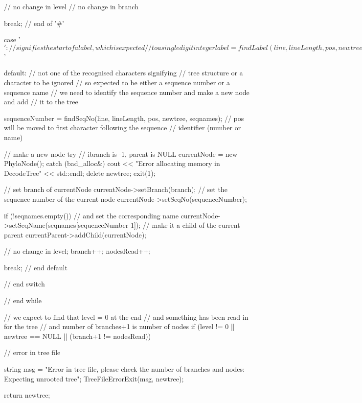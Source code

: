 \begin{DoxyCode}
{{{        // no change in level
        // no change in branch

        break;      // end of '#'

      case '$' :    // signifies the start of a label, which is expected 
                    // to a single digit integer
        label = findLabel(line, lineLength, pos, newtree);
        // findLabel() updates pos to be the character after 
        // the end of the label

                    // make the currentNode label the integer at this pos
        currentNode->setLabel(label);

        // no change in level
        // no change in branch

        break;      // end of '$'

      default:      // not one of the recognised characters signifying 
                    // tree structure or a character to be ignored
        // so expected to be either a sequence number or a sequence name
        // we need to identify the sequence number and make a new node and add 
        // it to the tree

        sequenceNumber = findSeqNo(line, lineLength, pos, newtree, seqnames);
        // pos will be moved to first character following the sequence 
        // identifier (number or name)

        // make a new node
        try
        {
                    // ibranch is -1, parent is NULL
          currentNode = new PhyloNode();
        }
        catch (bad_alloc&)
        {
          cout << "Error allocating memory in DecodeTree" << std::endl;
          delete newtree;
          exit(1);
        }

                    // set branch of currentNode
        currentNode->setBranch(branch);
                    // set the sequence number of the current node
        currentNode->setSeqNo(sequenceNumber);

        if (!seqnames.empty())
        {
                    // and set the corresponding name
          currentNode->setSeqName(seqnames[sequenceNumber-1]);
        }
        // make it a child of the current parent
        currentParent->addChild(currentNode);

        // no change in level;
        branch++;
        nodesRead++;

        break;      // end default
    }               // end switch
  }                 // end while

  // we expect to find that level = 0 at the end
  // and something has been read in for the tree
  // and number of branches+1 is number of nodes
  if (level != 0 || newtree == NULL || (branch+1 != nodesRead))
  {
    // error in tree file

    string msg = 
    "Error in tree file, please check the number of branches and nodes: 
       Expecting unrooted tree";
    TreeFileErrorExit(msg, newtree);
  }
  return newtree;
}
\end{DoxyCode}
